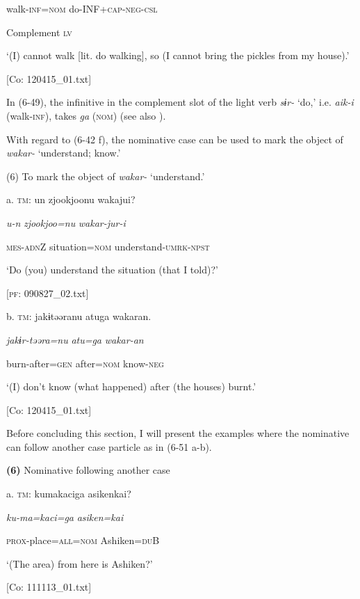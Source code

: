     walk-\textsc{inf}=\textsc{nom}  do-INF+\textsc{cap}-\textsc{neg}-\textsc{csl}

    Complement  \textsc{lv}

    ‘(I) cannot walk [lit. do walking], so (I cannot bring the pickles from my house).’

  [Co: 120415\_01.txt]

In (6-49), the infinitive in the complement slot of the light verb \textit{sɨr-} ‘do,’ i.e. \textit{aik-i} (walk-\textsc{inf}), takes \textit{ga} (\textsc{nom}) (see also ).

  With regard to (6-42 f), the nominative case can be used to mark the object of \textit{wakar-} ‘understand; know.’

(6)  To mark the object of \textit{wakar-} ‘understand.’

  a.  \textsc{tm}:  un  {\textbar}zjookjoo{\textbar}nu  wakajui?

      \textit{u-n}  \textit{zjookjoo=nu}  \textit{wakar-jur-i}

      \textsc{mes}-\textsc{adn}Z  situation=\textsc{nom}  understand-\textsc{umrk}-\textsc{npst}

      ‘Do (you) understand the situation (that I told)?’

      [\textsc{pf}: 090827\_02.txt]

  b.  \textsc{tm}:  jakɨtəəranu  atuga  wakaran.

      \textit{jakɨr-təəra=nu}  \textit{atu=ga}  \textit{wakar-an}

      burn-after=\textsc{gen}  after=\textsc{nom}  know-\textsc{neg}

      ‘(I) don’t know (what happened) after (the houses) burnt.’

      [Co: 120415\_01.txt]

  Before concluding this section, I will present the examples where the nominative can follow another case particle as in (6-51 a-b).

\textbf{(6)}  Nominative following another case

  a.  \textsc{tm}:  kumakaciga  asikenkai?

      \textit{ku-ma=kaci=ga}  \textit{asiken=kai}

      \textsc{prox}-place=\textsc{all}=\textsc{nom}  Ashiken=\textsc{du}B

      ‘(The area) from here is Ashiken?’

      [Co: 111113\_01.txt]

